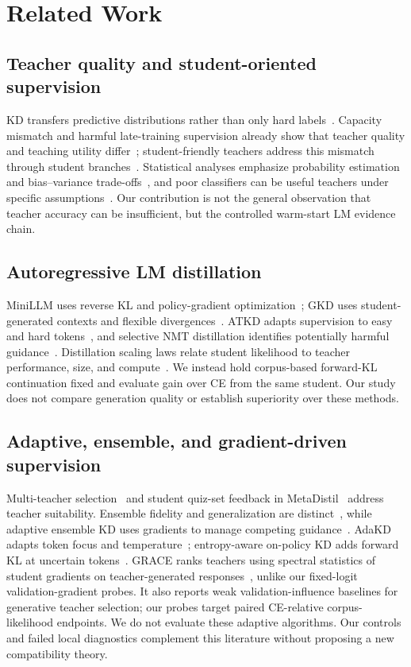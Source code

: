 \section{Related Work}\label{sec:related-work}

\subsection{Teacher quality and student-oriented supervision}
KD transfers predictive distributions rather than only hard labels~\citep{hinton2015distilling}. Capacity mismatch and harmful late-training supervision already show that teacher quality and teaching utility differ~\citep{cho2019efficacy}; student-friendly teachers address this mismatch through student branches~\citep{park2021friendly}. Statistical analyses emphasize probability estimation and bias--variance trade-offs~\citep{menon2021statistical}, and poor classifiers can be useful teachers under specific assumptions~\citep{kaplun2022bad}. Our contribution is not the general observation that teacher accuracy can be insufficient, but the controlled warm-start LM evidence chain.

\subsection{Autoregressive LM distillation}
MiniLLM uses reverse KL and policy-gradient optimization~\citep{gu2024minillm}; GKD uses student-generated contexts and flexible divergences~\citep{agarwal2024gkd}. ATKD adapts supervision to easy and hard tokens~\citep{zhong2024atkd}, and selective NMT distillation identifies potentially harmful guidance~\citep{wang2021selective}. Distillation scaling laws relate student likelihood to teacher performance, size, and compute~\citep{busbridge2025scaling}. We instead hold corpus-based forward-KL continuation fixed and evaluate gain over CE from the same student. Our study does not compare generation quality or establish superiority over these methods.

\subsection{Adaptive, ensemble, and gradient-driven supervision}
Multi-teacher selection~\citep{yuan2021selection} and student quiz-set feedback in MetaDistil~\citep{zhou2022metadistil} address teacher suitability. Ensemble fidelity and generalization are distinct~\citep{stanton2021really}, while adaptive ensemble KD uses gradients to manage competing guidance~\citep{du2020agree}. AdaKD adapts token focus and temperature~\citep{xie2026adakd}; entropy-aware on-policy KD adds forward KL at uncertain tokens~\citep{jin2026entropy}. GRACE ranks teachers using spectral statistics of student gradients on teacher-generated responses~\citep{panigrahi2026grace}, unlike our fixed-logit validation-gradient probes. It also reports weak validation-influence baselines for generative teacher selection; our probes target paired CE-relative corpus-likelihood endpoints. We do not evaluate these adaptive algorithms. Our controls and failed local diagnostics complement this literature without proposing a new compatibility theory.
